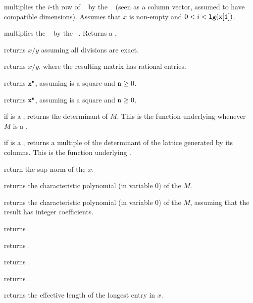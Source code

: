 


 multiplies the $i$-th row
of ~ by the ~ (seen as a column vector, assumed
to have compatible dimensions). Assumes that $x$ is non-empty and
$0 < i < {\tt lg(x[1])}$.

 multiplies the ~
by the ~. Returns a .

 returns $x/y$ assuming all divisions
are exact.

 returns $x/y$, where the resulting matrix
has rational entries.

 returns ${\tt x}^{\tt n}$, assuming 
is a square  and ${\tt n}\geq 0$.

 returns ${\tt x}^{\tt n}$, assuming 
is a square  and ${\tt n}\geq 0$.

 if  is a , returns the determinant of
$M$. This is the function underlying  whenever $M$ is a .

 if  is a , returns a multiple of
the determinant of the lattice generated by its columns. This is the function
underlying .

 return the sup norm of the  $x$.

 returns the characteristic polynomial (in
variable $0$) of the  $M$.

 returns the characteristic polynomial
(in variable $0$) of the  $M$, assuming that the result has integer
coefficients.

 returns .

 returns .

 returns .

 returns .

 returns the effective length of the longest
entry in $x$.

